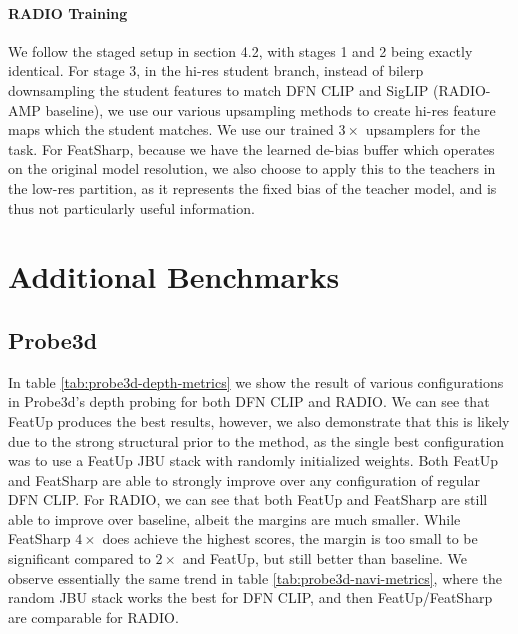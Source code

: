 \paragraph{RADIO Training}
We follow the staged setup in \cite{heinrich2024radioamplifiedimprovedbaselines} section 4.2, with stages 1 and 2 being exactly identical. For stage 3, in the hi-res student branch, instead of bilerp downsampling the student features to match DFN CLIP and SigLIP (RADIO-AMP baseline), we use our various upsampling methods to create hi-res feature maps which the student matches. We use our trained $3\times$ upsamplers for the task. For FeatSharp, because we have the learned de-bias buffer which operates on the original model resolution, we also choose to apply this to the teachers in the low-res partition, as it represents the fixed bias of the teacher model, and is thus not particularly useful information.

\section{Additional Benchmarks}

\subsection{Probe3d}
In table \ref{tab:probe3d-depth-metrics} we show the result of various configurations in Probe3d's \cite{elbanani2024probing} depth probing for both DFN CLIP and RADIO. We can see that FeatUp produces the best results, however, we also demonstrate that this is likely due to the strong structural prior to the method, as the single best configuration was to use a FeatUp JBU stack with randomly initialized weights. Both FeatUp and FeatSharp are able to strongly improve over any configuration of regular DFN CLIP. For RADIO, we can see that both FeatUp and FeatSharp are still able to improve over baseline, albeit the margins are much smaller. While FeatSharp $4\times$ does achieve the highest scores, the margin is too small to be significant compared to $2\times$ and FeatUp, but still better than baseline. We observe essentially the same trend in table \ref{tab:probe3d-navi-metrics}, where the random JBU stack works the best for DFN CLIP, and then FeatUp/FeatSharp are comparable for RADIO.

